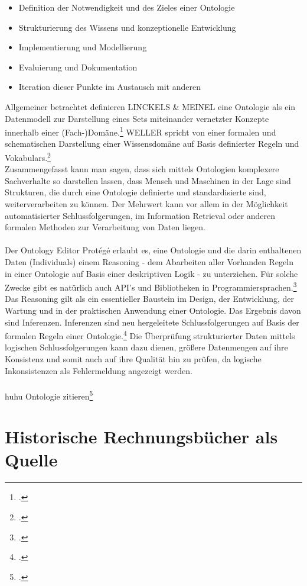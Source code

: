 \documentclass[12pt,a4paper]{article}
\begin{document}
\begin{itemize}
\item Definition der Notwendigkeit und des Zieles einer Ontologie
\item Strukturierung des Wissens und konzeptionelle Entwicklung
\item Implementierung und Modellierung
\item Evaluierung und Dokumentation
\item Iteration dieser Punkte im Austausch mit anderen
\end{itemize}
Allgemeiner betrachtet definieren LINCKELS \& MEINEL eine Ontologie als ein Datenmodell zur Darstellung eines Sets miteinander vernetzter Konzepte innerhalb einer (Fach-)Domäne.\footcite{linckels2011librarian}
WELLER spricht von einer formalen und schematischen Darstellung einer Wissensdomäne auf Basis definierter Regeln und Vokabulars.\footcite{weller2013InformationBand}
\\ 
Zusammengefasst kann man sagen, dass sich mittels Ontologien komplexere Sachverhalte so darstellen lassen, dass Mensch und Maschinen in der Lage sind Strukturen, die durch eine Ontologie definierte und standardisierte sind, weiterverarbeiten zu können. Der Mehrwert kann vor allem in der Möglichkeit automatisierter Schlussfolgerungen, im Information Retrieval oder anderen formalen Methoden zur Verarbeitung von Daten liegen.
\\
\\
Der Ontology Editor Protégé erlaubt es, eine Ontologie und die darin enthaltenen Daten (Individuals) einem Reasoning - dem Abarbeiten aller Vorhanden Regeln in einer Ontologie auf Basis einer deskriptiven Logik - zu unterziehen. Für solche Zwecke gibt es natürlich auch API's und Bibliotheken in Programmiersprachen.\footcite{musen2015protege} Das Reasoning gilt als ein essentieller Baustein im Design, der Entwicklung, der Wartung und in der praktischen Anwendung einer Ontologie. Das Ergebnis davon sind Inferenzen. Inferenzen sind neu hergeleitete Schlussfolgerungen auf Basis der formalen Regeln einer Ontologie.\footcite{dentler2011comparison} Die Überprüfung strukturierter Daten mittels logischen Schlussfolgerungen kann dazu dienen, größere Datenmengen auf ihre Konsistenz und somit auch auf ihre Qualität hin zu prüfen, da logische Inkonsistenzen als Fehlermeldung angezeigt werden.
\\
\\
huhu Ontologie zitieren\footcite[Vgl][S.162-178]{jannidis2017digital} 

\section{Historische Rechnungsbücher als Quelle}
\end{document}
